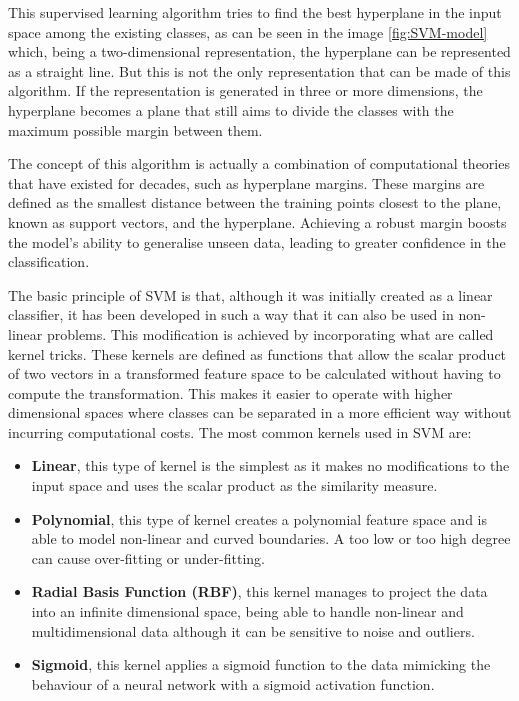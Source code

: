 This supervised learning algorithm tries to find the best hyperplane in the input space among the existing classes, as can be seen in the image \ref{fig:SVM-model} which, being a two-dimensional representation, the hyperplane can be represented as a straight line. But this is not the only representation that can be made of this algorithm. If the representation is generated in three or more dimensions, the hyperplane becomes a plane that still aims to divide the classes with the maximum possible margin between them. 

The concept of this algorithm is actually a combination of computational theories that have existed for decades, such as hyperplane margins. These margins are defined as the smallest distance between the training points closest to the plane, known as support vectors, and the hyperplane. Achieving a robust margin boosts the model's ability to generalise unseen data, leading to greater confidence in the classification.  

The basic principle of SVM is that, although it was initially created as a linear classifier, it has been developed in such a way that it can also be used in non-linear problems. This modification is achieved by incorporating what are called kernel tricks. These kernels are defined as functions that allow the scalar product of two vectors in a transformed feature space to be calculated without having to compute the transformation. This makes it easier to operate with higher dimensional spaces where classes can be separated in a more efficient way without incurring computational costs. The most common kernels used in SVM are:
\begin{itemize}
    \item \textbf{Linear}, this type of kernel is the simplest as it makes no modifications to the input space and uses the scalar product as the similarity measure. 
    \item \textbf{Polynomial}, this type of kernel creates a polynomial feature space and is able to model non-linear and curved boundaries. A too low or too high degree can cause over-fitting or under-fitting.
    \item \textbf{Radial Basis Function (RBF)}, this kernel manages to project the data into an infinite dimensional space, being able to handle non-linear and multidimensional data although it can be sensitive to noise and outliers. 
    \item \textbf{Sigmoid}, this kernel applies a sigmoid function to the data mimicking the behaviour of a neural network with a sigmoid activation function.
\end{itemize}

